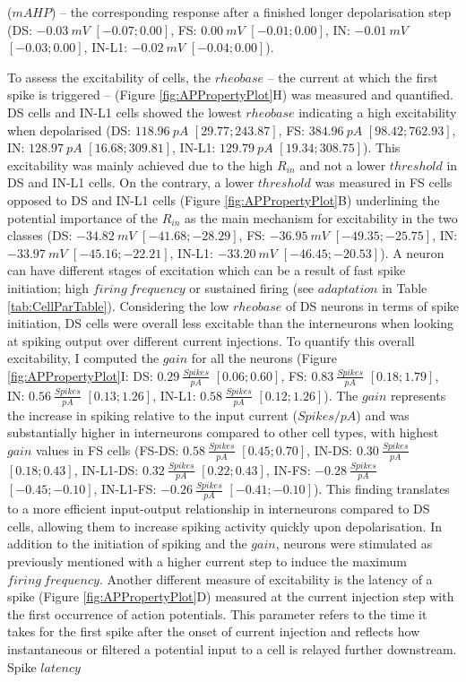 \documentclass[
  12pt,
  a4paper,
  openany]{book}
\begin{document}
(\(mAHP\)) -- the corresponding response after a finished longer depolarisation step (DS: \(-0.03\ mV\) \([-0.07; 0.00]\), FS: \(0.00\ mV\) \([-0.01; 0.00]\), IN: \(-0.01\ mV\) \([-0.03; 0.00]\), IN-L1: \(-0.02\ mV\) \([-0.04; 0.00]\)).

\FloatBarrier

To assess the excitability of cells, the \(rheobase\) -- the current at which the first spike is triggered -- (Figure \ref{fig:APPropertyPlot}H) was measured and quantified. DS cells and IN-L1 cells showed the lowest \(rheobase\) indicating a high excitability when depolarised (DS: \(118.96\ pA\) \([29.77; 243.87]\), FS: \(384.96\ pA\) \([98.42; 762.93]\), IN: \(128.97\ pA\) \([16.68; 309.81]\), IN-L1: \(129.79\ pA\) \([19.34; 308.75]\)). This excitability was mainly achieved due to the high \(R_{in}\) and not a lower \(threshold\) in DS and IN-L1 cells. On the contrary, a lower \(threshold\) was measured in FS cells opposed to DS and IN-L1 cells (Figure \ref{fig:APPropertyPlot}B) underlining the potential importance of the \(R_{in}\) as the main mechanism for excitability in the two classes (DS: \(-34.82\ mV\) \([-41.68; -28.29]\), FS: \(-36.95\ mV\) \([-49.35; -25.75]\), IN: \(-33.97\ mV\) \([-45.16; -22.21]\), IN-L1: \(-33.20\ mV\) \([-46.45; -20.53]\)). A neuron can have different stages of excitation which can be a result of fast spike initiation; high \(firing\ frequency\) or sustained firing (see \(adaptation\) in Table \ref{tab:CellParTable}). Considering the low \(rheobase\) of DS neurons in terms of spike initiation, DS cells were overall less excitable than the interneurons when looking at spiking output over different current injections. To quantify this overall excitability, I computed the \(gain\) for all the neurons (Figure \ref{fig:APPropertyPlot}I: DS: \(0.29\ \frac{Spikes}{pA}\) \([0.06; 0.60]\), FS: \(0.83\ \frac{Spikes}{pA}\) \([0.18; 1.79]\), IN: \(0.56\ \frac{Spikes}{pA}\) \([0.13; 1.26]\), IN-L1: \(0.58\ \frac{Spikes}{pA}\) \([0.12; 1.26]\)). The \(gain\) represents the increase in spiking relative to the input current (\(Spikes/pA\)) and was substantially higher in interneurons compared to other cell types, with highest \(gain\) values in FS cells (FS-DS: \(0.58\ \frac{Spikes}{pA}\) \([0.45; 0.70]\), IN-DS: \(0.30\ \frac{Spikes}{pA}\) \([0.18; 0.43]\), IN-L1-DS: \(0.32\ \frac{Spikes}{pA}\) \([0.22; 0.43]\), IN-FS: \(-0.28\ \frac{Spikes}{pA}\) \([-0.45; -0.10]\), IN-L1-FS: \(-0.26\ \frac{Spikes}{pA}\) \([-0.41; -0.10]\)). This finding translates to a more efficient input-output relationship in interneurons compared to DS cells, allowing them to increase spiking activity quickly upon depolarisation. In addition to the initiation of spiking and the \(gain\), neurons were stimulated as previously mentioned with a higher current step to induce the maximum \(firing\ frequency\). Another different measure of excitability is the latency of a spike (Figure \ref{fig:APPropertyPlot}D) measured at the current injection step with the first occurrence of action potentials. This parameter refers to the time it takes for the first spike after the onset of current injection and reflects how instantaneous or filtered a potential input to a cell is relayed further downstream. Spike \(latency\) 
\end{document}
